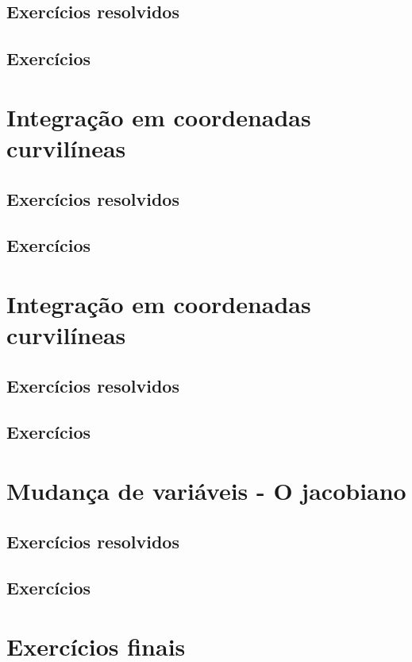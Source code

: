 \subsection*{Exercícios resolvidos}
\construirExeresol

\subsection*{Exercícios}
\construirExer

\section{Integração em coordenadas curvilíneas}

\subsection*{Exercícios resolvidos}
\construirExeresol

\subsection*{Exercícios}
\construirExer


\section{Integração em coordenadas curvilíneas}

\subsection*{Exercícios resolvidos}
\construirExeresol

\subsection*{Exercícios}
\construirExer


\section{Mudança de variáveis - O jacobiano}

\subsection*{Exercícios resolvidos}
\construirExeresol

\subsection*{Exercícios}
\construirExer




\section{Exercícios finais}
\construirExer

